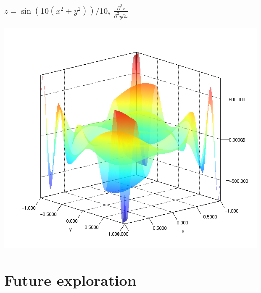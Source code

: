 \documentclass{beamer}
\begin{document}
    \begin{frame}
        \frametitle{$z = \sin(10(x^2 + y^2)) / 10$, $\frac{\partial^3 z}{\partial^2 y \partial x}$}
        \begin{center}
            \includegraphics[scale=0.4]{plot3d.png}
        \end{center}
    \end{frame}

    \section{Future exploration}\label{sec:fifth-section}
\end{document}
